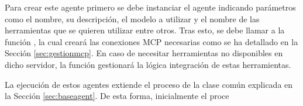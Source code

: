 Para crear este agente primero se debe instanciar el agente indicando parámetros como el nombre, su descripción, el modelo a utilizar y el nombre de las herramientas que se quieren utilizar entre otros. Tras esto, se debe llamar a la función , la cual creará las conexiones MCP necesarias como se ha detallado en la Sección \ref{sec:gestionmcp}. En caso de necesitar herramientas no disponibles en dicho servidor, la función  gestionará la lógica integración de estas herramientas.   


La ejecución de estos agentes extiende el proceso de la clase común  explicada en la Sección \ref{sec:baseagent}. De esta forma, inicialmente el proce 


